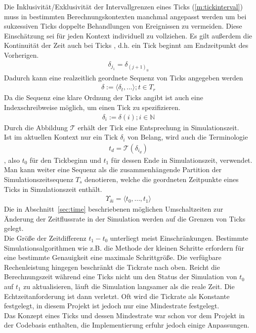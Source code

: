 Die Inklusivität/Exklusivität der Intervallgrenzen eines Ticks (\ref{m:tickinterval}) muss in bestimmten Berechnungskontexten manchmal angepasst werden um bei sukzessiven Ticks doppelte Behandlungen von Ereignissen zu vermeiden. Diese Einschätzung sei für jeden Kontext individuell zu vollziehen.
Es gilt außerdem die Kontinuität der Zeit auch bei Ticks , d.h. ein Tick beginnt am Endzeitpunkt des Vorherigen.
\begin{align}
	\delta_{j_1} = \delta_{(j+1)_0}\label{m:tick_continuity}
\end{align}
Dadurch kann eine realzeitlich geordnete Sequenz von Ticks angegeben werden
\begin{align}
	\delta := \langle \delta_t, ... \rangle ; t \in T_r
\end{align}
Da die Sequenz eine klare Ordnung der Ticks angibt ist auch eine Indexschreibweise möglich, um einen Tick zu spezifizieren.
\begin{align}
	\delta_i := \delta(i); i \in \mathbb{N}
\end{align}
Durch die Abbildung $\mathcal{T}$ erhält der Tick eine Entsprechung in Simulationszeit.\\
Ist im aktuellen Kontext nur ein Tick $\delta_i$ von Belang, wird auch die Terminologie 
\begin{align}
t_d = \mathcal{T}(\delta_{i_d})
\end{align}
, also $t_0$ für den Tickbeginn und $t_1$ für dessen Ende in Simulationszeit, verwendet.\\
Man kann weiter eine Sequenz als die zusammenhängende Partition der Simulationszeitsequenz $T_s$ denotieren, welche die geordneten Zeitpunkte eines Ticks in Simulationszeit enthält.
\begin{align}
\Upsilon_{\delta i} = \langle t_0, ...,  t_1\rangle
\end{align}
Die in Abschnitt~\ref{sec:time} beschriebenen möglichen Umschaltzeiten zur Änderung der Zeitflussrate in der Simulation werden auf die Grenzen von Ticks gelegt.\\
Die Größe der Zeitdifferenz $t_1 - t_0$ unterliegt meist Einschränkungen. Bestimmte Simulationsalgorithmen wie z.B. die Methode der kleinen Schritte erfordern für eine bestimmte Genauigkeit eine maximale Schrittgröße. Die verfügbare Rechenleistung hingegen beschränkt die Tickrate nach oben. Reicht die Berechnungszeit während eine Ticks nicht um den Status der Simulation von $t_0$ auf $t_1$ zu aktualisieren, läuft die Simulation langsamer als die reale Zeit. Die Echtzeitanforderung ist dann verletzt. Oft wird die Tickrate als Konstante festgelegt, in diesem Projekt ist jedoch nur eine Mindestrate festgelegt.\\
Das Konzept eines Ticks und dessen Mindestrate war schon vor dem Projekt in der Codebasis enthalten, die Implementierung erfuhr jedoch einige Anpassungen.


